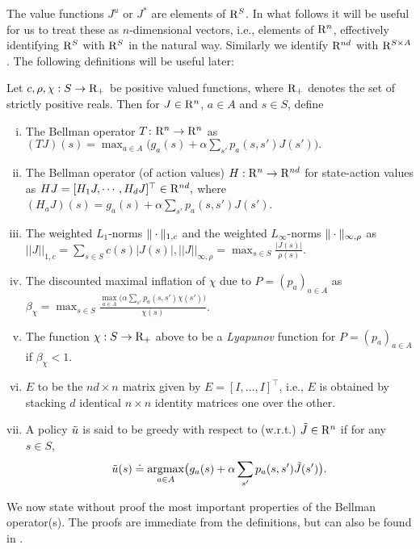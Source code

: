 The value functions $J^u$ or $J^*$ are elements of $\mathrm{R}^S$.
In what follows it will be useful for us to treat these as $n$-dimensional vectors, i.e., elements of $\mathrm{R}^n$, effectively identifying $\mathrm{R}^S$ with $\mathrm{R}^S$ in the natural way. Similarly we identify $\mathrm{R}^{nd}$ with $\mathrm{R}^{S\times A}$.
The following definitions will be useful later:
\begin{definition}
Let $c,\rho,\chi:S \to \mathrm{R}_+$ be positive valued functions, where $\mathrm{R}_+$ denotes the set of strictly positive reals. Then for $J\in \mathrm{R}^n$, $a\in A$ and $s\in S$, 
define
\begin{enumerate}[(i)]
\item The Bellman operator $T\colon \mathrm{R}^n \rightarrow \mathrm{R}^n$ as $(TJ)(s)=\max_{a \in A}\big(g_a(s)+\alpha \sum_{s'} p_a(s,s')J(s')\big).
$
\item \label{bellactval} The Bellman operator (of action values) $H: \mathrm{R}^n \to \mathrm{R}^{nd}$ for state-action values as $HJ=[ H_1 J,\cdots,H_d J]^\top\in \mathrm{R}^{nd},$ where $(H_a J)(s)= g_a(s)+\alpha \sum_{s'}p_a(s,s') J(s')$.
\item The weighted $L_1$-norms $\|\cdot\|_{1,c}$ 
and 
the weighted $L_\infty$-norms  $\|\cdot\|_{\infty,\rho}$ as $
||J||_{1,c}=\sum_{s \in S} c(s)|J(s)|, 
||J||_{\infty,\rho}=\max_{s \in S} \frac{|J(s)|}{\rho(s)}$.
\item The discounted maximal inflation of $\chi$ due to $P = (p_a)_{a\in A}$ as $\beta_{\chi}=\max_{s \in S} \frac{\underset{a \in A}{\max}\big(\alpha\sum_{s'}p_a(s,s')\chi(s')\big)}{\chi(s)}$.
\item The function $\chi:S\to\mathrm{R}_+$ above to be a \emph{Lyapunov} function for $P = (p_a)_{a\in A}$ if $\beta_{\chi}<1$.
\item $E$ to be the $nd\times n$ matrix given by $E=[I,\ldots,I]^\top$, i.e., $E$ is obtained by stacking $d$ identical $n\times n$ identity matrices one over the other.
\item A policy $\tilde{u}$ is said to be greedy with respect to (w.r.t.) $\tilde{J}\in \mathrm{R}^n$ if for any $s\in S$,
\begin{align*}\tilde{u}(s)\doteq\underset{a\in A}{\operatorname{argmax}}\big(g_a(s)+\alpha \sum_{s'}p_a(s,s')\tilde{J}(s')\big).\end{align*}
\end{enumerate}
\end{definition}
We now state without proof the most important properties of the Bellman operator(s).
The proofs are immediate from the definitions, but can also be found in \cite{BertB}.

